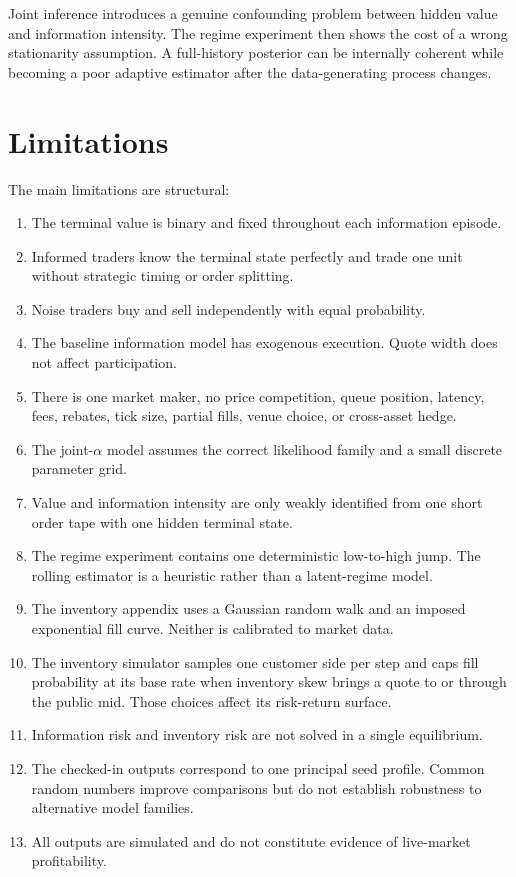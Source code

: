 \documentclass[11pt]{article}
\begin{document}
Joint inference introduces a genuine confounding problem between hidden value and information intensity. The regime experiment then shows the cost of a wrong stationarity assumption. A full-history posterior can be internally coherent while becoming a poor adaptive estimator after the data-generating process changes.

\section{Limitations}

The main limitations are structural:
\begin{enumerate}
\item The terminal value is binary and fixed throughout each information episode.
\item Informed traders know the terminal state perfectly and trade one unit without strategic timing or order splitting.
\item Noise traders buy and sell independently with equal probability.
\item The baseline information model has exogenous execution. Quote width does not affect participation.
\item There is one market maker, no price competition, queue position, latency, fees, rebates, tick size, partial fills, venue choice, or cross-asset hedge.
\item The joint-$\alpha$ model assumes the correct likelihood family and a small discrete parameter grid.
\item Value and information intensity are only weakly identified from one short order tape with one hidden terminal state.
\item The regime experiment contains one deterministic low-to-high jump. The rolling estimator is a heuristic rather than a latent-regime model.
\item The inventory appendix uses a Gaussian random walk and an imposed exponential fill curve. Neither is calibrated to market data.
\item The inventory simulator samples one customer side per step and caps fill probability at its base rate when inventory skew brings a quote to or through the public mid. Those choices affect its risk-return surface.
\item Information risk and inventory risk are not solved in a single equilibrium.
\item The checked-in outputs correspond to one principal seed profile. Common random numbers improve comparisons but do not establish robustness to alternative model families.
\item All outputs are simulated and do not constitute evidence of live-market profitability.
\end{enumerate}
\end{document}
